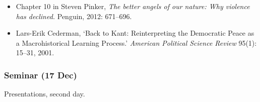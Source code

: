 \documentclass[12pt, a4paper]{article}
\begin{document}
\begin{itemize}
\setlength\itemsep{0pt}
\item Chapter 10 in Steven Pinker, \textit{The better angels of our nature: Why violence has declined.} Penguin, 2012: 671--696.
\item Lars-Erik Cederman, `Back to Kant: Reinterpreting the Democratic Peace as a Macrohistorical Learning Process.' \textit{American Political Science Review} 95(1): 15--31, 2001.
\end{itemize}

\subsubsection*{Seminar (17 Dec)}

Presentations, second day.
\end{document}
